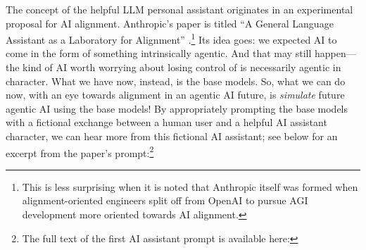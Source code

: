 The concept of the helpful LLM personal assistant originates in an experimental
proposal for AI alignment. Anthropic's paper is titled ``A General Language
Assistant as a Laboratory for Alignment''
\cite{askell2021assistant}.\footnote{This is less surprising when it is noted
that Anthropic itself was formed when alignment-oriented engineers split off
from OpenAI to pursue AGI development more oriented towards AI alignment.} Its
idea goes: we expected AI to come in the form of something intrinsically
agentic. And that may still happen---the kind of AI worth worrying about losing
control of is necessarily agentic in character. What we have now, instead, is
the base models. So, what we can do now, with an eye towards alignment in an
agentic AI future, is \emph{simulate} future agentic AI using the base models!
By appropriately prompting the base models with a fictional exchange between a
human user and a helpful AI assistant character, we can hear more from this
fictional AI assistant; see below for an excerpt from the paper's
prompt:\footnote{The full text of the first AI assistant prompt is available
here:
}

